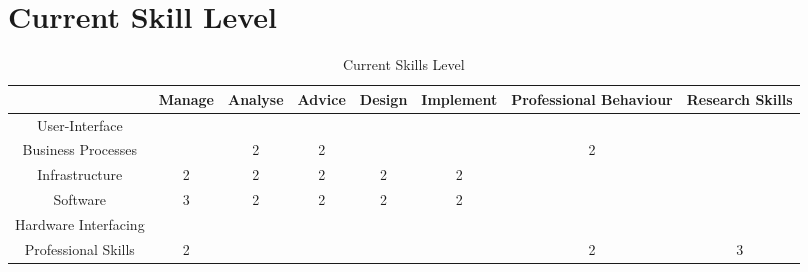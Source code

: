 
\section{Current Skill Level}
\label{sec:current}

\begin{table}[H]
	\centering
	\begin{tabular}{|c|c|c|c|c|c|c|c|}
		\hline
								& Manage 	& Analyse 	& Advice 	& Design 	& Implement 	& Professional Behaviour 	& Research Skills \\ \hline
		User-Interface 			& 			& 			& 			& 			& 	 			& 							& \\ \hline
		Business Processes 		& 			& 2			& 2 		& 			& 				& 2 						& \\ \hline
		Infrastructure 			& 2			& 2 		& 2			& 2 		& 2 			& 							& \\ \hline
		Software 				& 3 		& 2 		& 2 		& 2 		& 2 			& 							& \\ \hline
		Hardware Interfacing 	& 			& 			& 			& 			& 				& 							& \\ \hline
		Professional Skills 	& 2			& 			& 			& 			& 				& 2 						& 3 \\ \hline
	\end{tabular}
	\caption{Current Skills Level}
	\label{currentskills}
\end{table}